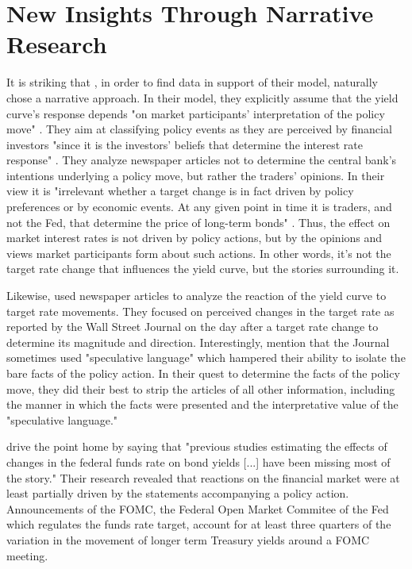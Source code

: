 \documentclass[11pt,a4paper,english,oneside]{book}
\numberwithin{equation}{chapter}
\begin{document}
%
%
%
%
%

\section{New Insights Through Narrative Research} \label{NewInsights}

It is striking that \cite{Ellingsen.2003}, in order to find data in support of their model, naturally chose a narrative approach. In their model, they explicitly assume that the yield curve's response depends "on market participants’ interpretation of the policy move" \citep[~p. 1603]{Ellingsen.2001}. They aim at classifying policy events as they are perceived by financial investors "since it is the investors’ beliefs that determine the interest rate response" \citet[~p. 1604]{Ellingsen.2001}. They analyze newspaper articles not to determine the central bank's intentions underlying a policy move, but rather the traders' opinions. In their view it is "irrelevant whether a target change is in fact driven by policy preferences or by economic events. At any given point in time it is traders, and not the Fed, that determine the price of long-term bonds" \cite[~p. 2]{Ellingsen.2003}. Thus, the effect on market interest rates is not driven by policy actions, but by the opinions and views market participants form about such actions. In other words, it's not the target rate change that influences the yield curve, but the stories surrounding it.

Likewise, \cite{Cook.1989} used newspaper articles to analyze the reaction of the yield curve to target rate movements. They focused on perceived changes in the target rate as reported by the Wall Street Journal on the day after a target rate change to determine its magnitude and direction. Interestingly, \citet[~p. 337]{Cook.1989} mention that the Journal sometimes used "speculative language" which hampered their ability to isolate the bare facts of the policy action. In their quest to determine the facts of the policy move, they did their best to strip the articles of all other information, including the manner in which the facts were presented and the interpretative value of the "speculative language." 

\citet[~pp. 86--87]{Gurkaynak.2004} drive the point home by saying that "previous studies estimating the effects of changes in the federal funds rate on bond yields [...] have been missing most of the story." Their research revealed that reactions on the financial market were at least partially driven by the  statements accompanying a policy action. Announcements of the FOMC, the Federal Open Market Commitee of the Fed which regulates the funds rate target, account for at least three quarters of the variation in the movement of longer term Treasury yields around a FOMC meeting.
\end{document}
